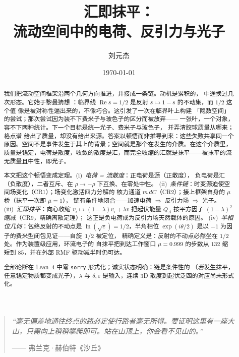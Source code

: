 \documentclass[aps,prd,preprint,superscriptaddress,amsmath,amssymb]{revtex4-2}
\begin{document}
\title{汇即抹平：\\
流动空间中的电荷、反引力与光子}

\author{刘元杰}

\date{\today}

\begin{abstract}
我们把流动空间框架沿两个几何方向推进，并接成一条链。动机是累积的，
中途换过几次形态。它始于黎曼猜想 \cite{riemann1859ueber}：临界线
$\operatorname{Re}s=1/2$ 是反射 $s\mapsto 1-s$ 的不动集，而 $1/2$ 这个值
像是被对称性逼出来的，不像巧合。这引发了一次在临界叶上构建
「隐数空间」的尝试；那次尝试因为装不下费米子与玻色子的区分而被放弃——
一张叶，一个对象，容不下两种统计。下一个目标是统一光子、费米子与玻色子，
并弄清胶球质量从哪来；格点谱 \cite{morningstar1999glueball,chen2006glueball}
给出了质量，却没有给出来源。答案以顿悟而非推导到来：这些失败共享同一个
原因。空间不是事件发生于其上的背景；空间就是那个在发生的介质。在这个介质里，
质量是锚定，电荷是散度，收敛的散度是汇，而完全收缩的汇就是抹平——被抹平的流
无质量且中性，即光子。

本文把这个顿悟变成定理。(i)~\emph{电荷 = 流散度}：正电荷是源（正散度），
负电荷是汇（负散度），二者互斥、在 $\rho\to-\rho$ 下互换、在零处中性。
(ii)~\emph{条件链}：时变源迫使空间场变化（CR1）；场变化激活四力分解的
核力通道 $m\,dC$（CR2）；接上框架自身的 $\mu$ 桥（抹平一次即 $\mu=1$），
链有条件地闭合——加速电荷 $\Rightarrow$ 反引力场 $\Rightarrow$ 光子。
(iii)~\emph{汇即抹平}：向心收缩 $v_i\mapsto(1-\lambda)v_i+\lambda\bar v$
把起伏能量 $Q_A$ 按平方因子 $(1-\lambda)^2$ 缩减（CR9，精确离散定理）；
这正是负电荷成为反引力场天然载体的原因。
(iv)~\emph{半相位几何}：包络反射的不动点是 $\ln(\sqrt e)=1/2$，半角相位
$\exp(i\theta/2)$ 是以 $-1$ 为因子的费米型闭包见证——自旋~$1/2$ 被定位，
精确定义是：反射的不动点必然坐在 $1/2$ 处。作为装置级应用，环流电子的
自抹平把到达工作窗口 $\mu=0.999$ 的步数从 $132$ 缩短到 $85$，并在外部
RMF 驱动减半时仍可达。

全部论断在 Lean~4 中零 \texttt{sorry} 形式化；诚实状态明确：链是条件性的
（\emph{若}发生抹平，任意锚定物质都变成光子），$\lambda$ 与 $\delta,\varepsilon$
是输入，连续 3D 散度到起伏泛函的对应尚未形式化。
\end{abstract}

\maketitle

\begin{quote}
\itshape
``毫无偏差地通往终点的路必定使行路者毫无所得。要证明这里有一座大山，只需向上稍稍攀爬即可。站在山顶上，你会看不见山的。''
\par
—— 弗兰克·赫伯特《沙丘》
\end{quote}
\end{document}
